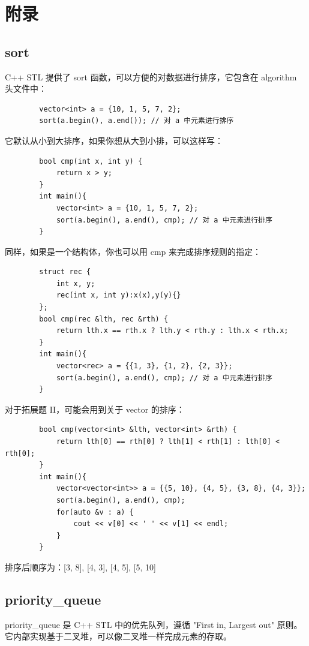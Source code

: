 \documentclass[12pt,a4paper]{article}
\begin{document}
\section{附录}

\subsection{sort}

C++ STL 提供了 sort 函数，可以方便的对数据进行排序，它包含在 algorithm 头文件中：

\begin{lstlisting}
        vector<int> a = {10, 1, 5, 7, 2};
        sort(a.begin(), a.end()); // 对 a 中元素进行排序
\end{lstlisting}

它默认从小到大排序，如果你想从大到小排，可以这样写：
\begin{lstlisting}
        bool cmp(int x, int y) {
            return x > y;
        }
        int main(){
            vector<int> a = {10, 1, 5, 7, 2};
            sort(a.begin(), a.end(), cmp); // 对 a 中元素进行排序
        }
\end{lstlisting}

同样，如果是一个结构体，你也可以用 cmp 来完成排序规则的指定：
\begin{lstlisting}
        struct rec {
            int x, y;
            rec(int x, int y):x(x),y(y){}
        };
        bool cmp(rec &lth, rec &rth) {
            return lth.x == rth.x ? lth.y < rth.y : lth.x < rth.x;
        }
        int main(){
            vector<rec> a = {{1, 3}, {1, 2}, {2, 3}};
            sort(a.begin(), a.end(), cmp); // 对 a 中元素进行排序
        }
\end{lstlisting}

对于拓展题 II，可能会用到关于 vector 的排序：

\begin{lstlisting}
        bool cmp(vector<int> &lth, vector<int> &rth) {
            return lth[0] == rth[0] ? lth[1] < rth[1] : lth[0] < rth[0];
        }
        int main(){
            vector<vector<int>> a = {{5, 10}, {4, 5}, {3, 8}, {4, 3}};
            sort(a.begin(), a.end(), cmp);
            for(auto &v : a) {
                cout << v[0] << ' ' << v[1] << endl;
            }
        }
\end{lstlisting}

排序后顺序为：[3, 8], [4, 3], [4, 5], [5, 10]

\subsection{priority\_queue}
priority\_queue 是 C++ STL 中的优先队列，遵循 "First in, Largest out" 原则。它内部实现基于二叉堆，可以像二叉堆一样完成元素的存取。
\end{document}
